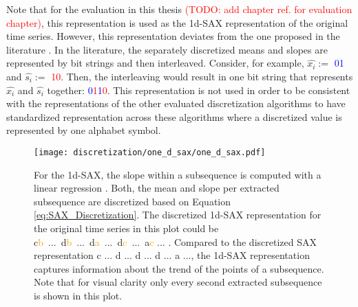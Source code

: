 Note that for the evaluation in this thesis \textcolor{red}{(TODO: add chapter ref. for evaluation chapter)}, this representation is used as the \ac{1d-SAX} representation of the original time series. However, this representation deviates from the one proposed in the literature \cite{1d-SAX}. In the literature, the separately discretized means and slopes are represented by bit strings and then interleaved. Consider, for example, $\hat{x_i} :=$ \textcolor{blue}{01} and $\hat{s_i} :=$ \textcolor{red}{10}. Then, the interleaving would result in one bit string that represents $\hat{x_i}$ and $\hat{s_i}$ together: \textcolor{blue}{0}\textcolor{red}{1}\textcolor{blue}{1}\textcolor{red}{0}. This representation is not used in order to be consistent with the representations of the other evaluated discretization algorithms to have standardized representation across these algorithms where a discretized value is represented by one alphabet symbol.
\begin{figure}[htb]
\centering
\texttt{[image: discretization/one\_d\_sax/one\_d\_sax.pdf]}
\caption[1d-Symbolic Aggregate Approximation - Mean \& Slope]{For the \ac{1d-SAX}, the slope within a subsequence is computed with a linear regression \cite{1d-SAX}. Both, the mean and slope per extracted subsequence are discretized based on Equation \ref{eq:SAX_Discretization}. The discretized \ac{1d-SAX} representation for the original time series in this plot could be \mbox{\textcolor[rgb]{0,0.39,0}{c}\textcolor{orange}{b} ... \textcolor[rgb]{0,0.39,0}{d}\textcolor{orange}{b} ... \textcolor[rgb]{0,0.39,0}{d}\textcolor{orange}{a} ... \textcolor[rgb]{0,0.39,0}{d}\textcolor{orange}{c} ... \textcolor[rgb]{0,0.39,0}{a}\textcolor{orange}{c}} ... . Compared to the discretized \ac{SAX} representation \textcolor[rgb]{0,0.39,0}{c} ... \textcolor[rgb]{0,0.39,0}{d} ... \textcolor[rgb]{0,0.39,0}{d} ... \textcolor[rgb]{0,0.39,0}{d} ... \textcolor[rgb]{0,0.39,0}{a} ..., the \ac{1d-SAX} representation captures information about the trend of the points of a subsequence. Note that for visual clarity only every second extracted subsequence is shown in this plot.}
\label{fig:1d-SAX}
\end{figure}
